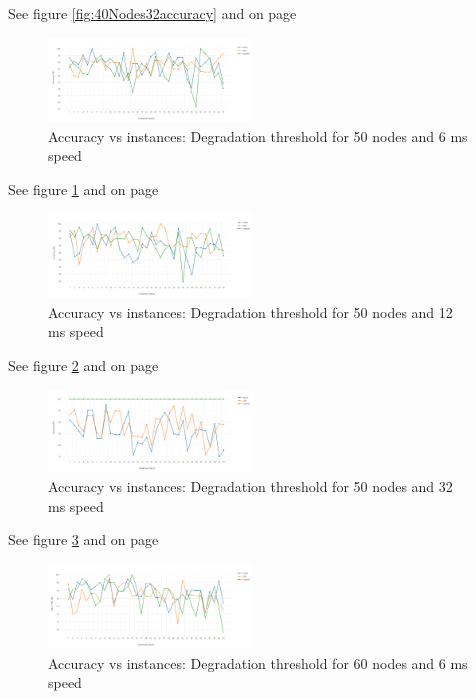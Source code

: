 \documentclass[letterpaper, 10 pt, conference]{ieeeconf}  %
\begin{document}
See figure \ref{fig:40Nodes32accuracy} and on page \pageref{fig:40Nodes32accuracy}




\begin{figure}[H]
\includegraphics[width=0.48\textwidth]{50Nodes06accuracy}
\caption{Accuracy vs instances: Degradation threshold for 50 nodes and 6 ms speed}
\label{fig:50Nodes06accuracy}
\end{figure}

See figure \ref{fig:50Nodes06accuracy} and on page \pageref{fig:50Nodes06accuracy}

\begin{figure}[H]
\includegraphics[width=0.48\textwidth]{50Nodes12accuracy.png}
\caption{Accuracy vs instances: Degradation threshold for 50 nodes and 12 ms speed}
\label{fig:50Nodes12accuracy}
\end{figure}

See figure \ref{fig:50Nodes12accuracy} and on page \pageref{fig:50Nodes12accuracy}


\begin{figure}[H]
\includegraphics[width=0.48\textwidth]{50Nodes32accuracy}
\caption{Accuracy vs instances: Degradation threshold for 50 nodes and 32 ms speed}
\label{fig:50Nodes32accuracy}
\end{figure}

See figure \ref{fig:50Nodes32accuracy} and on page \pageref{fig:50Nodes32accuracy}

\begin{figure}[H]
\includegraphics[width=0.48\textwidth]{60Nodes06accuracy}
\caption{Accuracy vs instances: Degradation threshold for 60 nodes and 6 ms speed}
\label{fig:60Nodes06accuracy}
\end{figure}
\end{document}
